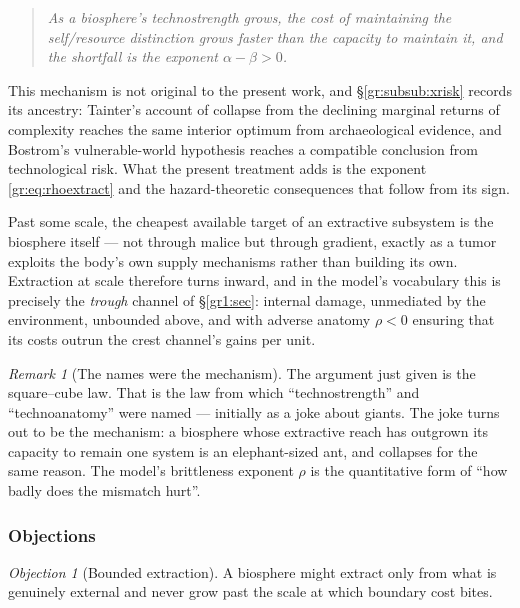 \documentclass[11pt]{article}
\numberwithin{equation}{section}
\theoremstyle{plain}
\theoremstyle{definition}
\theoremstyle{remark}
\newtheorem{remark}[theorem]{Remark}
\newtheorem{objection}[theorem]{Objection}
\begin{document}
\begin{quote}
\emph{As a biosphere's technostrength grows, the cost of maintaining the
self/resource distinction grows faster than the capacity to maintain
it, and the shortfall is the exponent $\alpha-\beta>0$.}
\end{quote}

\noindent This mechanism is not original to the present work, and
\S\ref{gr:subsub:xrisk} records its ancestry: Tainter's account of
collapse from the declining marginal returns of complexity
\cite{Tainter88} reaches the same interior optimum from archaeological
evidence, and Bostrom's vulnerable-world hypothesis \cite{Bostrom19}
reaches a compatible conclusion from technological risk. What the
present treatment adds is the exponent \eqref{gr:eq:rhoextract} and the
hazard-theoretic consequences that follow from its sign.

Past some scale, the cheapest available target of an extractive
subsystem is the biosphere itself --- not through malice but through
gradient, exactly as a tumor exploits the body's own supply mechanisms
rather than building its own. Extraction at scale therefore turns
inward, and in the model's vocabulary this is precisely the
\emph{trough} channel of \S\ref{gr1:sec}: internal damage, unmediated by the
environment, unbounded above, and with adverse anatomy $\rho<0$ ensuring
that its costs outrun the crest channel's gains per unit.

\begin{remark}[The names were the mechanism]\label{gr:rem:namesclosure}
The argument just given is the square--cube law. That is the law from
which ``technostrength'' and ``technoanatomy'' were named --- initially
as a joke about giants. The joke turns out to be the mechanism: a
biosphere whose extractive reach has outgrown its capacity to remain one
system is an elephant-sized ant, and collapses for the same reason. The
model's brittleness exponent $\rho$ is the quantitative form of ``how
badly does the mismatch hurt''.
\end{remark}

\subsubsection{Objections}\label{gr:subsub:objections}

\begin{objection}[Bounded extraction]\label{gr:obj:bounded}
A biosphere might extract only from what is genuinely external and never
grow past the scale at which boundary cost bites.
\end{objection}
\end{document}
